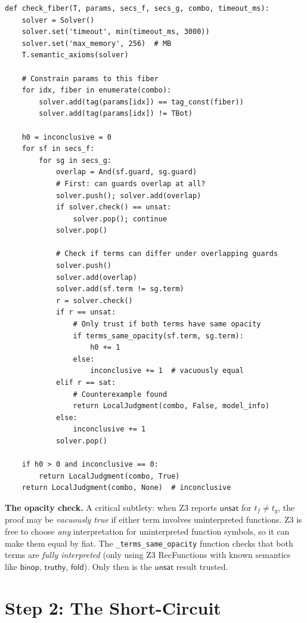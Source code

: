 \documentclass[11pt,a4paper]{report}
\theoremstyle{definition}
\theoremstyle{plain}
\newcommand{\fold}{\mathsf{fold}}
\begin{document}
\begin{lstlisting}[caption={Local equivalence check per fiber}]
def check_fiber(T, params, secs_f, secs_g, combo, timeout_ms):
    solver = Solver()
    solver.set('timeout', min(timeout_ms, 3000))
    solver.set('max_memory', 256)  # MB
    T.semantic_axioms(solver)

    # Constrain params to this fiber
    for idx, fiber in enumerate(combo):
        solver.add(tag(params[idx]) == tag_const(fiber))
        solver.add(tag(params[idx]) != TBot)

    h0 = inconclusive = 0
    for sf in secs_f:
        for sg in secs_g:
            overlap = And(sf.guard, sg.guard)
            # First: can guards overlap at all?
            solver.push(); solver.add(overlap)
            if solver.check() == unsat:
                solver.pop(); continue
            solver.pop()

            # Check if terms can differ under overlapping guards
            solver.push()
            solver.add(overlap)
            solver.add(sf.term != sg.term)
            r = solver.check()
            if r == unsat:
                # Only trust if both terms have same opacity
                if terms_same_opacity(sf.term, sg.term):
                    h0 += 1
                else:
                    inconclusive += 1  # vacuously equal
            elif r == sat:
                # Counterexample found
                return LocalJudgment(combo, False, model_info)
            else:
                inconclusive += 1
            solver.pop()

    if h0 > 0 and inconclusive == 0:
        return LocalJudgment(combo, True)
    return LocalJudgment(combo, None)  # inconclusive
\end{lstlisting}

\textbf{The opacity check.}  A critical subtlety: when Z3 reports
$\mathsf{unsat}$ for $t_f \neq t_g$, the proof may be
\emph{vacuously true} if either term involves uninterpreted functions.
Z3 is free to choose \emph{any} interpretation for uninterpreted
function symbols, so it can make them equal by fiat.  The
\texttt{\_terms\_same\_opacity} function checks that both terms
are \emph{fully interpreted} (only using Z3 RecFunctions with known
semantics like $\mathsf{binop}$, $\mathsf{truthy}$, $\fold$).
Only then is the $\mathsf{unsat}$ result trusted.

\section{Step 2: The Short-Circuit}
\end{document}
